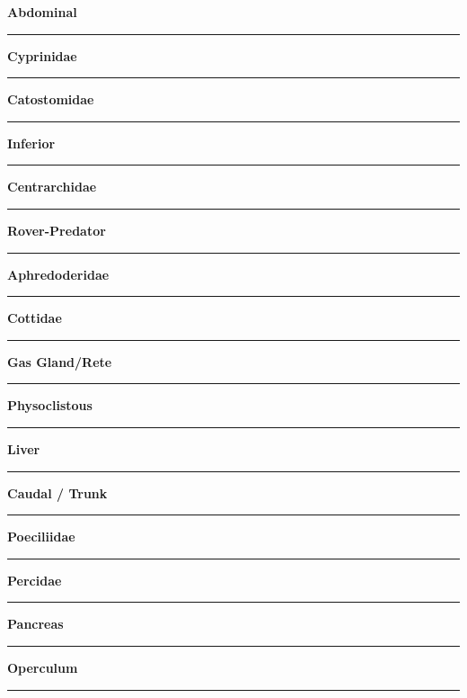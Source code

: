 \documentclass[11pt]{exam}
\newcommand*\Matching[1]{
\ifprintanswers
	\textbf{#1}
\else
	\rule{2.1in}{0.4pt}
\fi
}
\newlength\matchlena
\newlength\matchlenb
\newcommand\MatchQuestion[2]{%
	\setlength\matchlenb{\linewidth}
	\addtolength\matchlenb{-\matchlena}
	\parbox[t]{\matchlena}{\Matching{#1}}\enspace\parbox[t]{\matchlenb}{#2}}
\begin{document}
\begin{questions}
\begin{multicols}{2}
\question\MatchQuestion{Abdominal}{}
\vspace{2\baselineskip}

\question\MatchQuestion{Cyprinidae}{}
\vspace{2\baselineskip}

\question\MatchQuestion{Catostomidae}{}
\vspace{2\baselineskip}

\question\MatchQuestion{Inferior}{}
\vspace{2\baselineskip}

\question\MatchQuestion{Centrarchidae}{}
\vspace{2\baselineskip}

\question\MatchQuestion{Rover-Predator}{}
\vspace{2\baselineskip}

\question\MatchQuestion{Aphredoderidae}{}
\vspace{2\baselineskip}

\question\MatchQuestion{Cottidae}{}
\vspace{2\baselineskip}

\question\MatchQuestion{Gas Gland/Rete}{}
\vspace{2\baselineskip}

\question\MatchQuestion{Physoclistous}{}
\vspace{2\baselineskip}

\question\MatchQuestion{Liver}{}
\vspace{2\baselineskip}


\question\MatchQuestion{Caudal / Trunk}{}
\vspace{2\baselineskip}

%
%
\question\MatchQuestion{Poeciliidae}{}
\vspace{2\baselineskip}

\question\MatchQuestion{Percidae}{}
\vspace{2\baselineskip}

\question\MatchQuestion{Pancreas}{}
\vspace{2\baselineskip}

%
\question\MatchQuestion{Operculum}{}
\vspace{2\baselineskip}


\end{multicols}
\end{questions}
\end{document}
